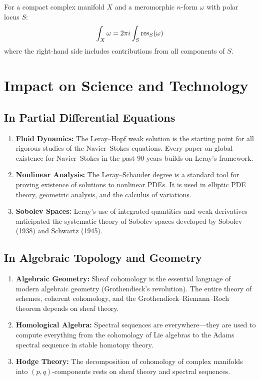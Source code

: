 \begin{theorem}
For a compact complex manifold $X$ and a meromorphic $n$-form $\omega$ with polar locus $S$:
\[
\int_X \omega = 2\pi i \int_S \operatorname{res}_S(\omega)
\]
where the right-hand side includes contributions from all components of $S$.
\end{theorem}

\section{Impact on Science and Technology}

\subsection{In Partial Differential Equations}

\begin{enumerate}
\item \textbf{Fluid Dynamics:} The Leray--Hopf weak solution is the starting point for all rigorous studies of the Navier--Stokes equations. Every paper on global existence for Navier--Stokes in the past 90 years builds on Leray's framework.
\item \textbf{Nonlinear Analysis:} The Leray--Schauder degree is a standard tool for proving existence of solutions to nonlinear PDEs. It is used in elliptic PDE theory, geometric analysis, and the calculus of variations.
\item \textbf{Sobolev Spaces:} Leray's use of integrated quantities and weak derivatives anticipated the systematic theory of Sobolev spaces developed by Sobolev (1938) and Schwartz (1945).
\end{enumerate}

\subsection{In Algebraic Topology and Geometry}

\begin{enumerate}
\item \textbf{Algebraic Geometry:} Sheaf cohomology is the essential language of modern algebraic geometry (Grothendieck's revolution). The entire theory of schemes, coherent cohomology, and the Grothendieck--Riemann--Roch theorem depends on sheaf theory.
\item \textbf{Homological Algebra:} Spectral sequences are everywhere---they are used to compute everything from the cohomology of Lie algebras to the Adams spectral sequence in stable homotopy theory.
\item \textbf{Hodge Theory:} The decomposition of cohomology of complex manifolds into $(p,q)$-components rests on sheaf theory and spectral sequences.
\end{enumerate}

